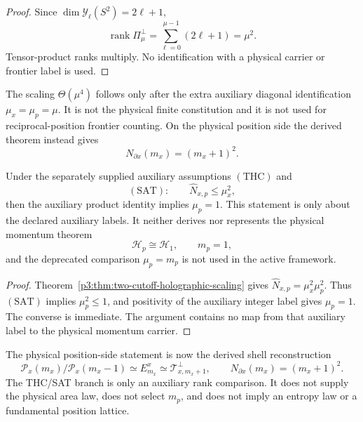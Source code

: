 \documentclass[11pt,a4paper]{article}
\begin{document}
\begin{proof}
Since \(\dim\mathscr Y_\ell(S^2)=2\ell+1\),
\[
 \operatorname{rank}\Pi_\mu^\perp
 =\sum_{\ell=0}^{\mu-1}(2\ell+1)=\mu^2.
\]
Tensor-product ranks multiply.  No identification with a physical carrier or
frontier label is used.
\end{proof}

\begin{corollary}
\label{p3:cor:m4-diagonal-artifact}
The scaling \(\Theta(\mu^4)\) follows only after the extra auxiliary diagonal
identification \(\mu_x=\mu_p=\mu\).  It is not the physical finite
constitution and it is not used for reciprocal-position frontier counting.
On the physical position side the derived theorem instead gives
\[
 \boxed{N_{\partial x}(m_x)=(m_x+1)^2.}
\]
\end{corollary}

\begin{proposition}
\label{p3:thm:holographic-admissibility-mp-one}
Under the separately supplied auxiliary assumptions
\((\mathrm{THC})\) and
\[
 (\mathrm{SAT}):\qquad
 \widehat N_{x,p}\le \mu_x^2,
\]
then the auxiliary product identity implies \(\mu_p=1\).  This statement is
only about the declared auxiliary labels.  It neither derives nor represents
the physical momentum theorem
\[
 \mathcal H_p\cong\mathcal H_1,\qquad m_p=1,
\]
and the deprecated comparison \(\mu_p=m_p\) is not used in the active
framework.
\end{proposition}

\begin{proof}
Theorem~\ref{p3:thm:two-cutoff-holographic-scaling} gives
\(\widehat N_{x,p}=\mu_x^2\mu_p^2\).  Thus \((\mathrm{SAT})\) implies
\(\mu_p^2\le1\), and positivity of the auxiliary integer label gives
\(\mu_p=1\).  The converse is immediate.  The argument contains no map from
that auxiliary label to the physical momentum carrier.
\end{proof}

\begin{remark}
The physical position-side statement is now the derived shell reconstruction
\[
 \boxed{
 \mathcal P_x(m_x)/\mathcal P_x(m_x-1)
 \simeq E_{m_x}^x
 \simeq\mathcal T_{x,m_x+1}^{\perp},
 \qquad N_{\partial x}(m_x)=(m_x+1)^2.}
\]
The THC/SAT branch is only an auxiliary rank comparison.
It does not supply the physical area law, does not select \(m_p\), and does
not imply an entropy law or a fundamental position lattice.
\end{remark}
\end{document}
